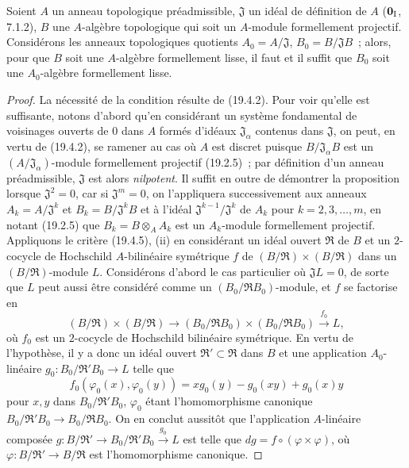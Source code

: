 \begin{proposition}[19.4.7]
\label{0.19.4.7-fr}
Soient $A$ un anneau topologique préadmissible, $\mathfrak J$ un idéal de
définition de $A$ ($\mathbf 0_{\rm I}$, 7.1.2), $B$ une $A$-algèbre
topologique qui soit un $A$-module formellement projectif. Considérons les
anneaux topologiques quotients $A_0=A/\mathfrak J$,
$B_0=B/\mathfrak JB$~; alors, pour que $B$ soit une $A$-algèbre formellement
lisse, il faut et il suffit que $B_0$ soit une $A_0$-algèbre formellement
lisse.
\end{proposition}


\begin{proof}
La nécessité de la condition résulte de (19.4.2). Pour voir qu'elle est
suffisante, notons d'abord qu'en considérant un système fondamental de
voisinages ouverts de $0$ dans $A$ formés d'idéaux
$\mathfrak J_\alpha$ contenus dans $\mathfrak J$, on peut, en vertu de
(19.4.2), se ramener au cas où $A$ est discret puisque
$B/\mathfrak J_\alpha B$ est un
$(A/\mathfrak J_\alpha)$-module formellement projectif (19.2.5)~; par
définition d'un anneau préadmissible, $\mathfrak J$ est alors
\emph{nilpotent}. Il suffit en outre de démontrer la proposition lorsque
$\mathfrak J^2=0$, car si $\mathfrak J^m=0$, on l'appliquera successivement
aux anneaux $A_k=A/\mathfrak J^k$ et $B_k=B/\mathfrak J^kB$ et à l'idéal
$\mathfrak J^{k-1}/\mathfrak J^k$ de $A_k$ pour $k=2,3,\ldots,m$, en
notant (19.2.5) que $B_k=B\otimes_A A_k$ est un $A_k$-module formellement
projectif. Appliquons le critère (19.4.5), (ii) en considérant un idéal ouvert
$\mathfrak R$ de $B$ et un $2$-cocycle de Hochschild $A$-bilinéaire
symétrique $f$ de $(B/\mathfrak R)\times(B/\mathfrak R)$ dans un
$(B/\mathfrak R)$-module $L$. Considérons d'abord le cas particulier où
$\mathfrak JL=0$, de sorte que $L$ peut aussi être considéré comme un
$(B_0/\mathfrak RB_0)$-module, et $f$ se factorise en
\[
  (B/\mathfrak R)\times(B/\mathfrak R)\to
  (B_0/\mathfrak RB_0)\times(B_0/\mathfrak RB_0)
  \xrightarrow{f_0}L,
\]
où $f_0$ est un $2$-cocycle de Hochschild bilinéaire symétrique. En vertu de
l'hypothèse, il y a donc un idéal ouvert
$\mathfrak R'\subset\mathfrak R$ dans $B$ et une application
$A_0$-linéaire $g_0:B_0/\mathfrak R'B_0\to L$ telle que
\[
  f_0(\varphi_0(x),\varphi_0(y))
  =xg_0(y)-g_0(xy)+g_0(x)y
\]
pour $x,y$ dans $B_0/\mathfrak R'B_0$, $\varphi_0$ étant
l'homomorphisme canonique
$B_0/\mathfrak R'B_0\to B_0/\mathfrak RB_0$. On en conclut aussitôt que
l'application $A$-linéaire composée
$g:B/\mathfrak R'\to B_0/\mathfrak R'B_0\xrightarrow{g_0}L$ est telle
que $dg=f\circ(\varphi\times\varphi)$, où
$\varphi:B/\mathfrak R'\to B/\mathfrak R$ est l'homomorphisme
canonique.


\end{proof}
